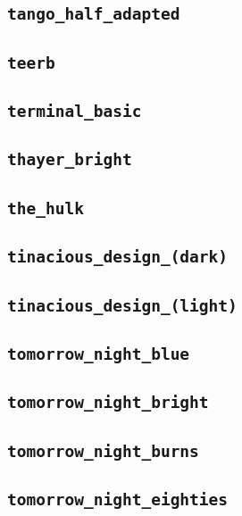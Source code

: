 \subsection{\texttt{tango\_half\_adapted}}
\newpage
\subsection{\texttt{teerb}}
\newpage
\subsection{\texttt{terminal\_basic}}
\newpage
\subsection{\texttt{thayer\_bright}}
\newpage
\subsection{\texttt{the\_hulk}}
\newpage
\subsection{\texttt{tinacious\_design\_(dark)}}
\newpage
\subsection{\texttt{tinacious\_design\_(light)}}
\newpage
\subsection{\texttt{tomorrow\_night\_blue}}
\newpage
\subsection{\texttt{tomorrow\_night\_bright}}
\newpage
\subsection{\texttt{tomorrow\_night\_burns}}
\newpage
\subsection{\texttt{tomorrow\_night\_eighties}}
\newpage
